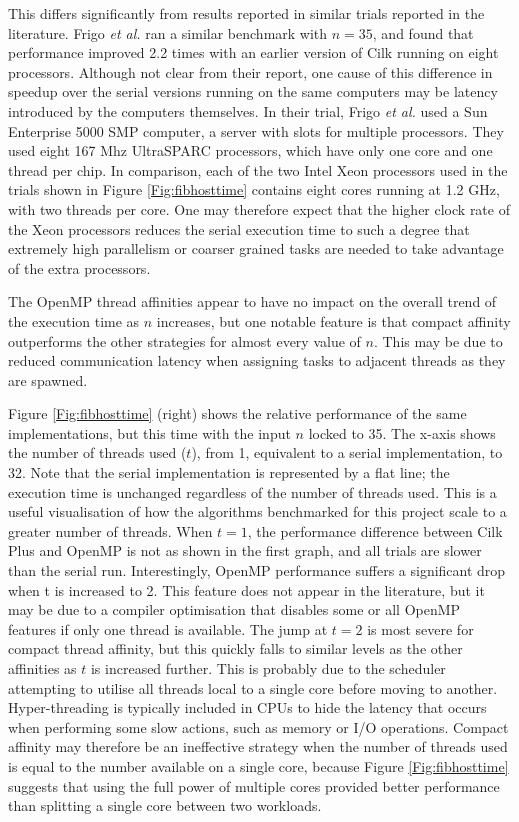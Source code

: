\documentclass{report}
\begin{document}
This differs significantly from results reported in similar trials reported in the literature. Frigo \textit{et al.}\cite{Frigo98} ran a similar benchmark with \(n=35\), and found that performance improved 2.2 times with an earlier version of Cilk running on eight processors. Although not clear from their report, one cause of this difference in speedup over the serial versions running on the same computers may be latency introduced by the computers themselves. In their trial, Frigo \textit{et al.} used a Sun Enterprise 5000 SMP computer, a server with slots for multiple processors. They used eight 167 Mhz UltraSPARC processors, which have only one core and one thread per chip. In comparison, each of the two Intel Xeon processors used in the trials shown in Figure \ref{Fig:fibhosttime} contains eight cores running at 1.2 GHz, with two threads per core. One may therefore expect that the higher clock rate of the Xeon processors reduces the serial execution time to such a degree that extremely high parallelism or coarser grained tasks are needed to take advantage of the extra processors.

The OpenMP thread affinities appear to have no impact on the overall trend of the execution time as \(n\) increases, but one notable feature is that compact affinity outperforms the other strategies for almost every value of \(n\). This may be due to reduced communication latency when assigning tasks to adjacent threads as they are spawned.

Figure \ref{Fig:fibhosttime} (right) shows the relative performance of the same implementations, but this time with the input \(n\) locked to 35. The x-axis shows the number of threads used (\(t\)), from 1, equivalent to a serial implementation, to 32. Note that the serial implementation is represented by a flat line; the execution time is unchanged regardless of the number of threads used. This is a useful visualisation of how the algorithms benchmarked for this project scale to a greater number of threads. When \(t=1\), the performance difference between Cilk Plus and OpenMP is not as shown in the first graph, and all trials are slower than the serial run. Interestingly, OpenMP performance suffers a significant drop when t is increased to 2. This feature does not appear in the literature, but it may be due to a compiler optimisation that disables some or all OpenMP features if only one thread is available. The jump at \(t=2\) is most severe for compact thread affinity, but this quickly falls to similar levels as the other affinities as \(t\) is increased further. This is probably due to the scheduler attempting to utilise all threads local to a single core before moving to another. Hyper-threading is typically included in CPUs to hide the latency that occurs when performing some slow actions, such as memory or I/O operations. Compact affinity may therefore be an ineffective strategy when the number of threads used is equal to the number available on a single core, because Figure \ref{Fig:fibhosttime} suggests that using the full power of multiple cores provided better performance than splitting a single core between two workloads.
\end{document}
